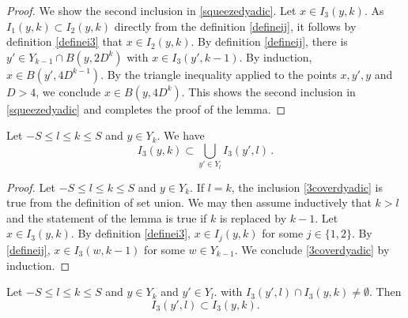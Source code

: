 \begin{proof}
We show the second inclusion in \eqref{squeezedyadic}.
Let $x\in I_3(y,k)$. As $I_1(y,k)\subset I_2(y,k)$
directly from the definition \eqref{defineij},
it follows by definition \eqref{definei3} that
$x\in I_2(y,k)$. By definition
\eqref{defineij}, there is $y'\in Y_{k-1}\cap B(y,2D^k)$
with $x\in I_3(y',k-1)$. By induction,
$x\in B(y', 4D^{k-1})$. By the triangle inequality
applied to the points $x,y',y$ and $D>4$, we conclude
$x\in B(y,4D^k)$.
This shows the second inclusion in \eqref{squeezedyadic} and completes the proof of the lemma.
\end{proof}

\begin{lemma}
\label{cover by cubes}
Let  $-S\le l\le k\le S$ and
$y\in Y_k$.
We have
\begin{equation}\label{3coverdyadic}
   I_3(y,k)\subset \bigcup_{y'\in Y_l} I_3(y',l)\, .
\end{equation}
\end{lemma}
\begin{proof}

Let $-S\le l\le k\le S$ and $y\in Y_k$.
If $l=k$, the inclusion \eqref{3coverdyadic}
is true from the definition of set union.
We may then assume inductively that $k>l$ and the statement of the lemma is true if $k$ is replaced by $k-1$.
Let $x\in I_3(y,k)$.
By definition \eqref{definei3},  $x\in I_j(y,k)$
for some $j\in \{1,2\}$. By \eqref{defineij},
$x\in I_3(w,k-1)$ for some $w\in Y_{k-1}$.
We conclude \eqref{3coverdyadic} by induction.
\end{proof}

\begin{lemma}
\label{dyadic property}
Let  $-S\le l\le k\le S$ and
$y\in Y_k$ and  $y'\in Y_l$.
with
$I_3(y',l)\cap I_3(y,k)\neq \emptyset$.  Then
\begin{equation}
    \label{3dyadicproperty}
I_3(y',l)\subset I_3(y,k).
\end{equation}


\end{lemma}

